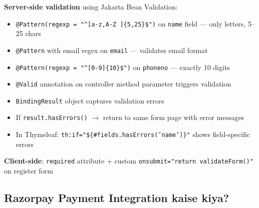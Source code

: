 \documentclass[12pt,a4paper]{article}
\begin{document}
\begin{answerbox}
\textbf{Server-side validation} using Jakarta Bean Validation:
\begin{itemize}
    \item \texttt{@Pattern(regexp = "\^{}[a-z,A-Z ]\{5,25\}\$")} on \texttt{name} field --- only letters, 5--25 chars
    \item \texttt{@Pattern} with email regex on \texttt{email} --- validates email format
    \item \texttt{@Pattern(regexp = "\^{}[0-9]\{10\}\$")} on \texttt{phoneno} --- exactly 10 digits
    \item \texttt{@Valid} annotation on controller method parameter triggers validation
    \item \texttt{BindingResult} object captures validation errors
    \item If \texttt{result.hasErrors()} $\rightarrow$ return to same form page with error messages
    \item In Thymeleaf: \texttt{th:if="\$\{\#fields.hasErrors('name')\}"} shows field-specific errors
\end{itemize}

\textbf{Client-side}: \texttt{required} attribute + custom \texttt{onsubmit="return validateForm()"} on register form
\end{answerbox}

\subsection{Razorpay Payment Integration kaise kiya?}
\end{document}
